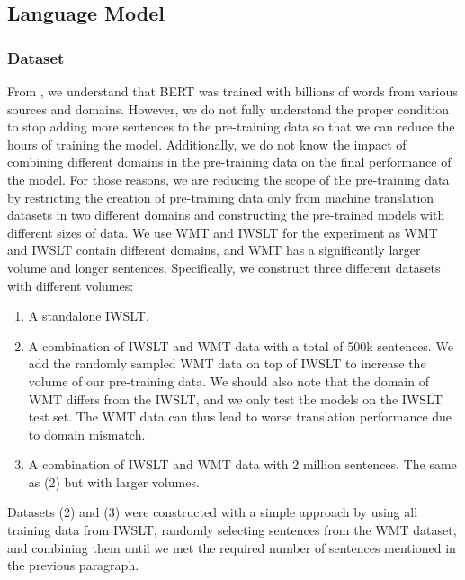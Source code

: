 \subsection{Language Model}
\label{ssec:langmodel}
\subsubsection{Dataset}
\label{ssec:langmodeldataset}
From \cite{devlin2018bert}, we understand that BERT was trained with billions of words from various sources and domains. However, we do not fully understand the proper condition to stop adding more sentences to the pre-training data so that we can reduce the hours of training the model. Additionally, we do not know the impact of combining different domains in the pre-training data on the final performance of the model. For those reasons, we are reducing the scope of the pre-training data by restricting the creation of pre-training data only from machine translation datasets in two different domains and constructing the pre-trained models with different sizes of data. We use WMT and IWSLT for the experiment as WMT and IWSLT contain different domains, and WMT has a significantly larger volume and longer sentences. Specifically, we construct three different datasets with different volumes:
\begin{enumerate}
    \item A standalone IWSLT.
    \item A combination of IWSLT and WMT data with a total of 500k sentences. We add the randomly sampled WMT data on top of IWSLT to increase the volume of our pre-training data. We should also note that the domain of WMT differs from the IWSLT, and we only test the models on the IWSLT test set. The WMT data can thus lead to worse translation performance due to domain mismatch.
    \item A combination of IWSLT and WMT data with 2 million sentences. The same as (2) but with larger volumes.
\end{enumerate}

Datasets (2) and (3) were constructed with a simple approach by using all training data from IWSLT, randomly selecting sentences from the WMT dataset, and combining them until we met the required number of sentences mentioned in the previous paragraph.

